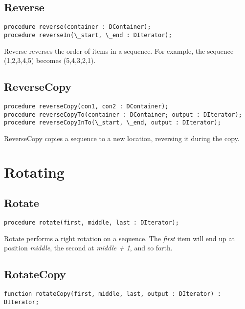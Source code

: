 \documentclass{report}
\begin{document}
\subsection{Reverse}

\begin{lstlisting}
procedure reverse(container : DContainer);
procedure reverseIn(\_start, \_end : DIterator);
\end{lstlisting}

Reverse reverses the order of items in a sequence. For 
example, the sequence (1,2,3,4,5) becomes (5,4,3,2,1).

\subsection{ReverseCopy}

\begin{lstlisting}
procedure reverseCopy(con1, con2 : DContainer);
procedure reverseCopyTo(container : DContainer; output : DIterator);
procedure reverseCopyInTo(\_start, \_end, output : DIterator);
\end{lstlisting}

ReverseCopy copies a sequence to a new location, reversing 
it during the copy.

\section{Rotating}

\subsection{Rotate}

\begin{lstlisting}
procedure rotate(first, middle, last : DIterator);
\end{lstlisting}

Rotate performs a right rotation on a sequence. The \emph{first} item will
end up at position \emph{middle}, the second at \emph{middle + 1}, and so
forth.

\subsection{RotateCopy}

\begin{lstlisting}
function rotateCopy(first, middle, last, output : DIterator) : DIterator;
\end{lstlisting}
\end{document}
